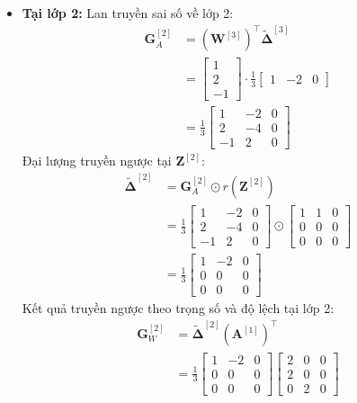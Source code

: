 \begin{itemize}
    \item \textbf{Tại lớp 2:}
    Lan truyền sai số về lớp 2:
    \begin{align*}
    \mathbf{G}_A^{[2]} &= \left(\mathbf{W}^{[3]}\right)^{\top} \widetilde{\boldsymbol{\Delta}}^{[3]} \\
    &= \begin{bmatrix} 1 \\ 2 \\ -1 \end{bmatrix} \cdot \frac{1}{3}\begin{bmatrix} 1 & -2 & 0 \end{bmatrix} \\
    &= \frac{1}{3}\begin{bmatrix} 1 & -2 & 0 \\ 2 & -4 & 0 \\ -1 & 2 & 0 \end{bmatrix}
    \end{align*}
    Đại lượng truyền ngược tại $\mathbf{Z}^{[2]}$:
    \begin{align*}
    \widetilde{\boldsymbol{\Delta}}^{[2]} &= \mathbf{G}_A^{[2]} \odot r\!\left(\mathbf{Z}^{[2]}\right) \\
    &= \frac{1}{3}\begin{bmatrix} 1 & -2 & 0 \\ 2 & -4 & 0 \\ -1 & 2 & 0 \end{bmatrix} \odot \begin{bmatrix} 1 & 1 & 0 \\ 0 & 0 & 0 \\ 0 & 0 & 0 \end{bmatrix} \\
    &= \frac{1}{3}\begin{bmatrix} 1 & -2 & 0 \\ 0 & 0 & 0 \\ 0 & 0 & 0 \end{bmatrix}
    \end{align*}
    Kết quả truyền ngược theo trọng số và độ lệch tại lớp 2:
    \begin{align*}
    \mathbf{G}_W^{[2]} &= \widetilde{\boldsymbol{\Delta}}^{[2]}\left(\mathbf{A}^{[1]}\right)^{\top} \\
    &= \frac{1}{3}\begin{bmatrix} 1 & -2 & 0 \\ 0 & 0 & 0 \\ 0 & 0 & 0 \end{bmatrix}\begin{bmatrix} 2 & 0 & 0 \\ 2 & 0 & 0 \\ 0 & 2 & 0 \end{bmatrix} \\

\end{align*}
\end{itemize}
